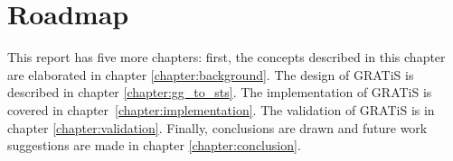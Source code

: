 \section{Roadmap}
This report has five more chapters: first, the concepts described in this chapter are elaborated in chapter \ref{chapter:background}. The design of GRATiS is described in chapter \ref{chapter:gg_to_sts}. The implementation of GRATiS is covered in chapter~\ref{chapter:implementation}. The validation of GRATiS is in chapter \ref{chapter:validation}. Finally, conclusions are drawn and future work suggestions are made in chapter \ref{chapter:conclusion}.

